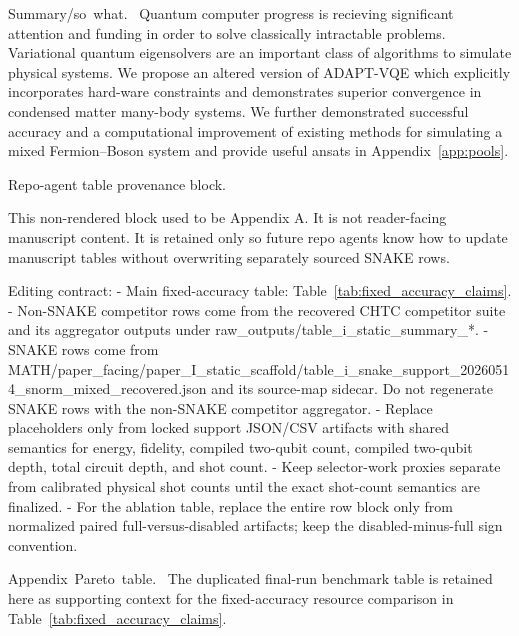 \documentclass[
  reprint,
  amsmath,
  amssymb,
  aps,
  pra,
  nofootinbib,
  superscriptaddress,
  floatfix
]{revtex4-2}
\newcommand{\tentative}[1]{\textcolor{red!70!black}{#1}}
\newcommand{\structlabel}[1]{\noindent\mbox{\tentative{#1.}}~}
\begin{document}
\structlabel{Summary/so what}
Quantum computer progress is recieving significant attention and funding in order to solve classically intractable problems. Variational quantum eigensolvers are an important class of algorithms to simulate physical systems. We propose an altered version of ADAPT-VQE which explicitly incorporates hard-ware constraints and demonstrates superior convergence in condensed matter many-body systems. We further demonstrated successful accuracy and a computational improvement of existing methods for simulating a mixed Fermion--Boson system and provide useful ansats in Appendix~\ref{app:pools}.


\clearpage
\appendix

\iffalse
Repo-agent table provenance block.

This non-rendered block used to be Appendix A. It is not reader-facing
manuscript content. It is retained only so future repo agents know how to
update manuscript tables without overwriting separately sourced SNAKE rows.

Editing contract:
- Main fixed-accuracy table: Table~\ref{tab:fixed_accuracy_claims}.
- Non-SNAKE competitor rows come from the recovered CHTC competitor suite and
  its aggregator outputs under raw_outputs/table_i_static_summary_*.
- SNAKE rows come from
  MATH/paper_facing/paper_I_static_scaffold/table_i_snake_support_20260514_snorm_mixed_recovered.json
  and its source-map sidecar. Do not regenerate SNAKE rows with the non-SNAKE
  competitor aggregator.
- Replace placeholders only from locked support JSON/CSV artifacts with shared
  semantics for energy, fidelity, compiled two-qubit count, compiled two-qubit
  depth, total circuit depth, and shot count.
- Keep selector-work proxies separate from calibrated physical shot counts
  until the exact shot-count semantics are finalized.
- For the ablation table, replace the entire row block only from normalized
  paired full-versus-disabled artifacts; keep the disabled-minus-full sign
  convention.

\structlabel{Appendix Pareto table}
The duplicated final-run benchmark table is retained here as supporting context for the fixed-accuracy resource comparison in Table~\ref{tab:fixed_accuracy_claims}.
\end{document}
